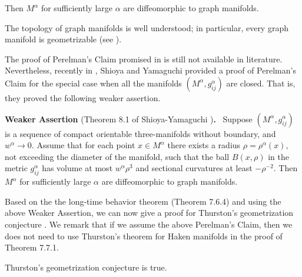 Then $M^{\alpha}$ for sufficiently large $\alpha$ are
diffeomorphic to graph manifolds.

\medskip
The topology of graph manifolds is well understood; in particular,
every graph manifold is geometrizable (see \cite{W}).

The proof of Perelman's Claim promised in \cite{P2} is still not
available in literature. Nevertheless, recently in \cite{ShY},
Shioya and Yamaguchi provided a proof of Perelman's Claim for the
special case when all the manifolds $(M^{\alpha},g^{\alpha}_{ij})$
are closed. That is, they proved the following weaker assertion.

\medskip
{\bf Weaker Assertion} (Theorem 8.1 of Shioya-Yamaguchi
\cite{ShY}){\bf .}  \ Suppose
$(M^{\alpha},g^{\alpha}_{ij})$ is a sequence of compact orientable
three-manifolds without boundary, and $w^{\alpha}\rightarrow 0$.
Assume that for each point $x \in M^{\alpha}$ there exists a
radius $\rho = \rho^{\alpha}(x),$ not exceeding the diameter of
the manifold, such that the ball $B(x,\rho)$ in the metric
$g^{\alpha}_{ij}$ has volume at most $w^{\alpha}\rho^3$ and
sectional curvatures at least $-\rho^{-2}$. Then $M^{\alpha}$ for
sufficiently large $\alpha$ are diffeomorphic to graph manifolds.

\medskip
Based on the the long-time behavior theorem (Theorem 7.6.4) and
using the above Weaker Assertion, we can now give a proof for
Thurston's geometrization conjecture . We remark that if we assume the above
Perelman's Claim, then we does not need to use Thurston's theorem
for Haken manifolds in the proof of Theorem 7.7.1.

\begin{theorem}
  \label{thm:cz-thurston-geometrization}

Thurston's geometrization conjecture is true.
\end{theorem}

